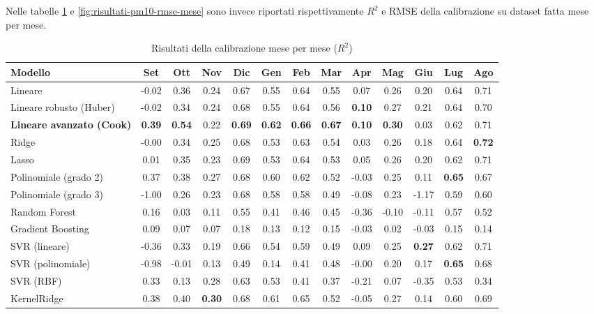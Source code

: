 Nelle tabelle \ref{fig:risultati-pm10-mese} e \ref{fig:risultati-pm10-rmse-mese} sono invece riportati rispettivamente $R^2$ e RMSE della calibrazione su dataset  fatta mese per mese.

\begin{table}[H]
    \tiny
    \centering
    \setlength{\tabcolsep}{4pt}
    \def\arraystretch{1.5}
    \begin{tabular}{|l|c|c|c|c|c|c|c|c|c|c|c|c|}
    \hline
        \textbf{Modello} & \textbf{Set} & \textbf{Ott} & \textbf{Nov} & \textbf{Dic} & \textbf{Gen} & \textbf{Feb} & \textbf{Mar} & \textbf{Apr} & \textbf{Mag} & \textbf{Giu} & \textbf{Lug} & \textbf{Ago} \\ \hline
        Lineare & -0.02 & 0.36 & 0.24 & 0.67 & 0.55 & 0.64 & 0.55 & 0.07 & 0.26 & 0.20 & 0.64 & 0.71 \\ \hline
        Lineare robusto (Huber) & -0.02 & 0.34 & 0.24 & 0.68 & 0.55 & 0.64 & 0.56 & \textbf{0.10} & 0.27 & 0.21 & 0.64 & 0.70 \\ \hline
        \textbf{Lineare avanzato (Cook)} & \textbf{0.39} & \textbf{0.54} & 0.22 & \textbf{0.69} & \textbf{0.62} & \textbf{0.66} & \textbf{0.67} & \textbf{0.10} & \textbf{0.30} & 0.03 & 0.62 & 0.71 \\ \hline
        Ridge & -0.00 & 0.34 & 0.25 & 0.68 & 0.53 & 0.63 & 0.54 & 0.03 & 0.26 & 0.18 & 0.64 & \textbf{0.72} \\ \hline
        Lasso & 0.01 & 0.35 & 0.23 & 0.69 & 0.53 & 0.64 & 0.53 & 0.05 & 0.26 & 0.20 & 0.62 & 0.71 \\ \hline
        Polinomiale (grado 2) & 0.37 & 0.38 & 0.27 & 0.68 & 0.60 & 0.62 & 0.52 & -0.03 & 0.25 & 0.11 & \textbf{0.65} & 0.67 \\ \hline
        Polinomiale (grado 3) & -1.00 & 0.26 & 0.23 & 0.68 & 0.58 & 0.58 & 0.49 & -0.08 & 0.23 & -1.17 & 0.59 & 0.60 \\ \hline
        Random Forest & 0.16 & 0.03 & 0.11 & 0.55 & 0.41 & 0.46 & 0.45 & -0.36 & -0.10 & -0.11 & 0.57 & 0.52 \\ \hline
        Gradient Boosting & 0.09 & 0.07 & 0.07 & 0.18 & 0.13 & 0.12 & 0.15 & -0.03 & 0.02 & -0.03 & 0.15 & 0.14 \\ \hline
        SVR (lineare) & -0.36 & 0.33 & 0.19 & 0.66 & 0.54 & 0.59 & 0.49 & 0.09 & 0.25 & \textbf{0.27} & 0.62 & 0.71 \\ \hline
        SVR (polinomiale) & -0.98 & -0.01 & 0.13 & 0.49 & 0.14 & 0.41 & 0.48 & -0.00 & 0.20 & 0.17 & \textbf{0.65} & 0.68 \\ \hline
        SVR (RBF) & 0.33 & 0.13 & 0.28 & 0.63 & 0.53 & 0.41 & 0.37 & -0.21 & 0.07 & -0.35 & 0.53 & 0.34 \\ \hline
        KernelRidge & 0.38 & 0.40 & \textbf{0.30} & 0.68 & 0.61 & 0.65 & 0.52 & -0.05 & 0.27 & 0.14 & 0.60 & 0.69 \\ \hline
    \end{tabular}
    \caption{Risultati della calibrazione  mese per mese ($R^2$)}
    \label{fig:risultati-pm10-mese}
\end{table}

